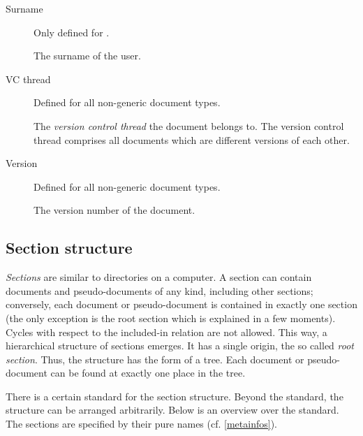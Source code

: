 \documentclass{generic}
\begin{document}
\begin{description}
\item[Surname]
  Only defined for .

  The surname of the user.

\item[VC thread]
  Defined for all non-generic document types.

  The \emph{version control thread} the document belongs to. The version
  control thread comprises all documents which are different versions of each
  other.

\item[Version]
  Defined for all non-generic document types.

  The version number of the document.

\end{description}


\subsection{Section structure}\label{sec_struct}

\emph{Sections} are similar to directories on a computer. A section can contain
documents and pseudo-documents of any kind, including other sections;
conversely, each document or pseudo-document is contained in exactly one
section (the only exception is the root section which is explained in a few
moments). Cycles with respect to the included-in relation are not allowed.
This way, a hierarchical structure of sections emerges. It has a single origin,
the so called \emph{root section}. Thus, the structure has the form of a
tree. Each document or pseudo-document can be found at exactly one place in the
tree.

There is a certain standard for the section structure. Beyond the standard, the
structure can be arranged arbitrarily. Below is an overview over the standard.
The sections are specified by their pure names (cf. \ref{metainfos}).
\end{document}
